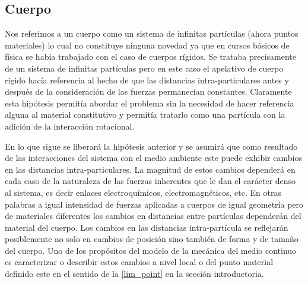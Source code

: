 \documentclass[../notas medios.tex]{subfiles}
\begin{document}
\subsection{Cuerpo}
Nos referimos a un cuerpo como un sistema de infinitas partículas (ahora puntos materiales) lo cual no constituye ninguna novedad ya que en cursos básicos de física se había trabajado con el caso de cuerpos rígidos.  Se trataba precisamente de un sistema de infinitas partículas pero en este caso el apelativo de cuerpo rígido hacía referencia al hecho de que las distancias intra-particulares antes y después de la consideración de las fuerzas permanecían constantes.  Claramente esta hipótesis permitía abordar el problema sin la necesidad de hacer referencia alguna al material constitutivo y permitía tratarlo como una partícula con la adición de la interacción rotacional.

En lo que sigue se liberará la hipótesis anterior y se asumirá que como resultado de las interacciones del sistema con el medio ambiente este puede exhibir cambios en las distancias intra-particulares.  La magnitud de estos cambios dependerá en cada caso de la naturaleza de las fuerzas inherentes que le dan el carácter denso al sistema, es decir enlaces electroquímicos, electromagnéticos, etc.  En otras palabras a igual intensidad de fuerzas aplicadas a cuerpos de igual geometría pero de materiales diferentes los cambios en distancias entre partículas dependerán del material del cuerpo.  Los cambios en las distancias intra-partícula se reflejarán posiblemente no solo en cambios de posición sino también de forma y de tamaño del cuerpo.  Uno de los propósitos del modelo de la mecánica del medio continuo es caracterizar o describir estos cambios a nivel local o del punto material definido este en el sentido de la \cref{lim_point} en la sección introductoria.
\end{document}

